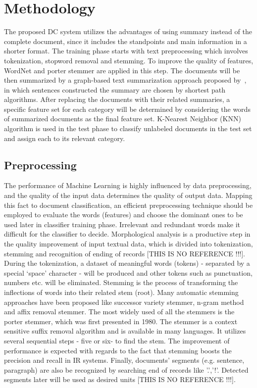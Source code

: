 \documentclass{sigchi}
\begin{document}
\section{Methodology}\label{sectionMethodology}
The proposed DC system utilizes the advantages of using summary instead of the complete document, since it includes the standpoints and main information in a shorter format.
The training phase starts with text preprocessing which involves tokenization, stopword removal and stemming. 
To improve the quality of features, WordNet and porter stemmer are applied in this step. 
The documents will be then summarized by a graph-based text summarization approach proposed by~\cite{sjobergh2006extraction}, in which sentences constructed the summary are chosen by shortest path algorithms. 
After replacing the documents with their related summaries, a specific feature set for each category will be determined by considering the words
of summarized documents as the final feature set. 
K-Nearest Neighbor (KNN) algorithm is used in the test phase to classify unlabeled documents in the test set and assign each to its relevant category.

\subsection{Preprocessing}\label{sectionPreprocessing}
The performance of Machine Learning is highly influenced by data preprocessing, and the quality of the input data determines the quality of output data. 
Mapping this fact to document classification, an efficient preprocessing technique should be employed to evaluate the words (features) and choose the dominant ones to be used later in classifier training phase. 
Irrelevant and redundant words make it difficult for the classifier to decide.
Morphological analysis is a productive step in the quality improvement of input textual data, which is divided into tokenization, stemming and recognition of ending of records [THIS IS NO REFERENCE !!!]. 
During the tokenization, a dataset of meaningful words (tokens) - separated by a special ‘space’ character - will be produced and other tokens such as punctuation, numbers etc. will be eliminated. 
Stemming is the process of transforming the inflections of words into their related stem (root)\cite{Allan:2003:SLM:860435.860548}.
Many automatic stemming approaches have been proposed like successor variety stemmer, n-gram method and affix removal stemmer. 
The most widely used of all the stemmers is the porter stemmer, which was first presented in 1980. 
The stemmer is a context sensitive suffix removal algorithm and is available in many languages. 
It utilizes several sequential steps - five or six- to find the stem. 
The improvement of performance is expected with regards to the fact that stemming boosts the precision and recall in IR systems.
Finally, documents' segments (e.g. sentence, paragraph) are also be recognized by searching end of records like '.','!'.
Detected segments later will be used as desired units [THIS IS NO REFERENCE !!!].
\end{document}
